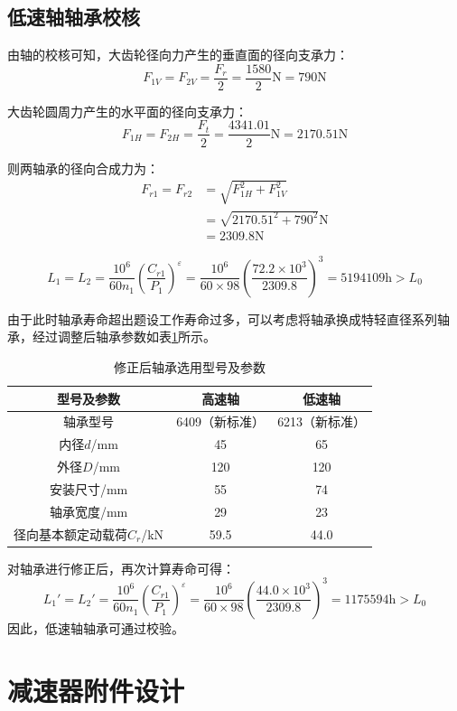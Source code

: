 \documentclass[12pt]{ctexart}
\begin{document}
\subsection{低速轴轴承校核}

由轴的校核可知，大齿轮径向力产生的垂直面的径向支承力：
$$F_{1V}=F_{2V}=\frac{F_r}{2}=\frac{1580}{2}\text{N}=790\text{N}$$

大齿轮圆周力产生的水平面的径向支承力：
$$F_{1H}=F_{2H}=\frac{F_t}{2}=\frac{4341.01}{2}\text{N}=2170.51\text{N}$$

则两轴承的径向合成力为：
\begin{align*}
    F_{r1} =F_{r2}& =\sqrt{F_{1H}^2+F_{1V}^2}\\
        & = \sqrt{2170.51^2+790^2}\text{N}\\
        & = 2309.8\text{N}
\end{align*}

$$L_{1}=L_2=
\frac{10^6}{60n_1}\left(\frac{C_{r1}}{P_1}\right)^\varepsilon 
= \frac{10^6}{60\times 98}\left(\frac{72.2\times 10^3}{2309.8}\right)^3
=5194109\text{h}>L_0$$

由于此时轴承寿命超出题设工作寿命过多，可以考虑将轴承换成特轻直径系列轴承，经过调整后轴承参数如表\ref{table13}所示。
\begin{table}[htbp]
    \centering
    \setlength{\belowcaptionskip}{0.3cm}
    \caption{修正后轴承选用型号及参数}
    \begin{tabular}{c c c}
        \toprule
        型号及参数 & 高速轴 & 低速轴\\
        \midrule
        轴承型号 & 6409（新标准） & 6213（新标准） \\
        内径$d$/mm & 45 & 65 \\
        外径$D$/mm & 120 & 120 \\
        安装尺寸/mm & 55 & 74 \\
        轴承宽度/mm & 29 & 23 \\
        径向基本额定动载荷$C_r$/kN & 59.5 & 44.0 \\
        \bottomrule
    \end{tabular}
    
    \label{table13}
\end{table}

对轴承进行修正后，再次计算寿命可得：
$$L_{1}'=L_2'=
\frac{10^6}{60n_1}\left(\frac{C_{r1}}{P_1}\right)^\varepsilon 
= \frac{10^6}{60\times 98}\left(\frac{44.0\times 10^3}{2309.8}\right)^3
=1175594\text{h}>L_0$$
因此，低速轴轴承可通过校验。

\section{减速器附件设计}
\end{document}

